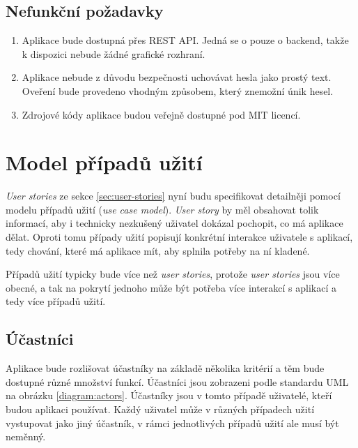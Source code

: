 \documentclass[thesis=B,czech]{FITthesis}[2012/06/26]
\begin{document}
		\subsection{Nefunkční požadavky}
		\begin{enumerate}
			\item Aplikace bude dostupná přes REST API. Jedná se o pouze o backend, takže k dispozici nebude žádné grafické rozhraní.
			
			\item Aplikace nebude z důvodu bezpečnosti uchovávat hesla jako prostý text. Oveření bude provedeno vhodným způsobem, který znemožní únik hesel.
			
			\item Zdrojové kódy aplikace budou veřejně dostupné pod MIT licencí.
		\end{enumerate}
		
	\section{Model případů užití}
		\textit{User stories} ze sekce \ref{sec:user-stories} nyní budu specifikovat detailněji pomocí modelu případů užití (\textit{use case model}). \textit{User story} by měl obsahovat tolik informací, aby i technicky nezkušený uživatel dokázal pochopit, co má aplikace dělat. Oproti tomu případy užití popisují konkrétní interakce uživatele s aplikací, tedy chování, které má aplikace mít, aby splnila potřeby na ní kladené. \cite{user-stories-vs-use-cases}
		
		Případů užití typicky bude více než \textit{user stories}\cite{si-usecases}, protože \textit{user stories} jsou více obecné, a tak na pokrytí jednoho může být potřeba více interakcí s aplikací a tedy více případů užití.
		
		\subsection{Účastníci}
			Aplikace bude rozlišovat účastníky na základě několika kritérií a těm bude dostupné různé množství funkcí. Účastníci jsou zobrazeni podle standardu UML na obrázku \ref{diagram:actors}.
			Účastníky jsou v tomto případě uživatelé, kteří budou aplikaci používat. Každý uživatel může v různých případech užití vystupovat jako jiný účastník, v rámci jednotlivých případů užití ale musí být neměnný. \cite{uml-unified-process} 
			
\end{document}
